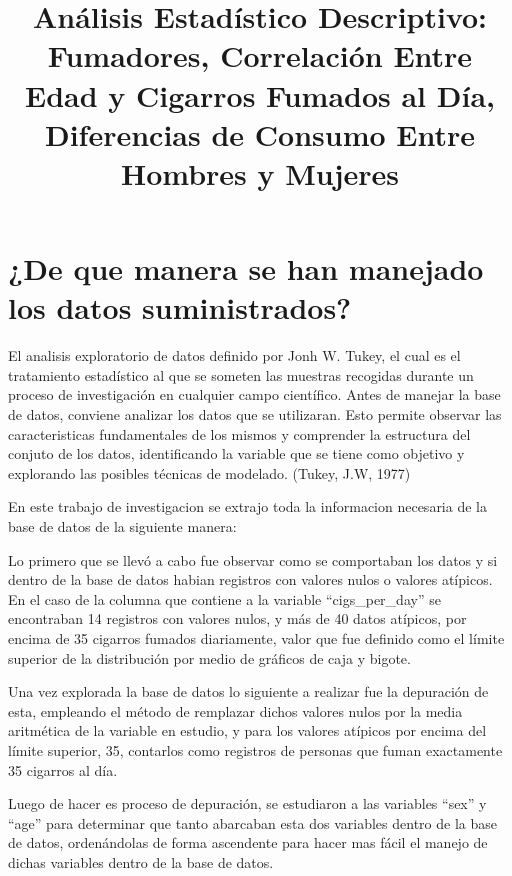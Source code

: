 \documentclass[
  stu,
  longtable,
  nolmodern,
  notxfonts,
  notimes,
  colorlinks=true,linkcolor=blue,citecolor=blue,urlcolor=blue]{apa7}
\title{Análisis Estadístico Descriptivo: Fumadores, Correlación Entre
Edad y Cigarros Fumados al Día, Diferencias de Consumo Entre Hombres y
Mujeres}
\begin{document}
\maketitle


\setcounter{secnumdepth}{-\maxdimen} %

\setlength\LTleft{0pt}


\section{¿De que manera se han manejado los datos
suministrados?}\label{de-que-manera-se-han-manejado-los-datos-suministrados}

El analisis exploratorio de datos definido por Jonh W. Tukey, el cual es
el tratamiento estadístico al que se someten las muestras recogidas
durante un proceso de investigación en cualquier campo científico. Antes
de manejar la base de datos, conviene analizar los datos que se
utilizaran. Esto permite observar las caracteristicas fundamentales de
los mismos y comprender la estructura del conjuto de los datos,
identificando la variable que se tiene como objetivo y explorando las
posibles técnicas de modelado. (Tukey, J.W, 1977)

En este trabajo de investigacion se extrajo toda la informacion
necesaria de la base de datos de la siguiente manera:

Lo primero que se llevó a cabo fue observar como se comportaban los
datos y si dentro de la base de datos habian registros con valores nulos
o valores atípicos. En el caso de la columna que contiene a la variable
``cigs\_per\_day'' se encontraban 14 registros con valores nulos, y más
de 40 datos atípicos, por encima de 35 cigarros fumados diariamente,
valor que fue definido como el límite superior de la distribución por
medio de gráficos de caja y bigote.

Una vez explorada la base de datos lo siguiente a realizar fue la
depuración de esta, empleando el método de remplazar dichos valores
nulos por la media aritmética de la variable en estudio, y para los
valores atípicos por encima del límite superior, 35, contarlos como
registros de personas que fuman exactamente 35 cigarros al día.

Luego de hacer es proceso de depuración, se estudiaron a las variables
``sex'' y ``age'' para determinar que tanto abarcaban esta dos variables
dentro de la base de datos, ordenándolas de forma ascendente para hacer
mas fácil el manejo de dichas variables dentro de la base de datos.
\end{document}
